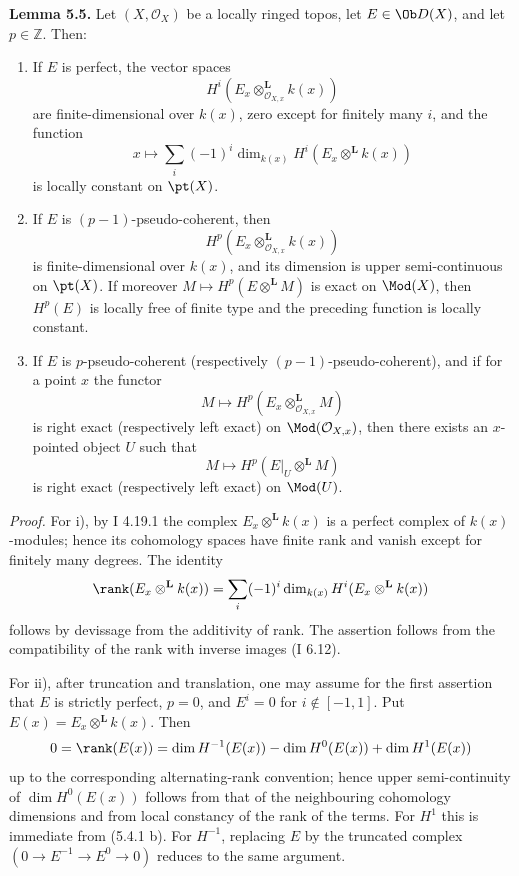 \textbf{Lemma 5.5.} Let \((X,\mathcal O_X)\) be a locally ringed topos, let \(E\in\Ob D(X)\), and let \(p\in\mathbb Z\). Then:
\begin{enumerate}[label=\roman*)]
\item If \(E\) is perfect, the vector spaces
\[
 H^i(E_x\otimes_{\mathcal O_{X,x}}^{\mathbf L}k(x))
\]
are finite-dimensional over \(k(x)\), zero except for finitely many \(i\), and the function
\[
 x\longmapsto
 \sum_i(-1)^i\dim_{k(x)}H^i(E_x\otimes^{\mathbf L}k(x))
\]
is locally constant on \(\pt(X)\).
\item If \(E\) is \((p-1)\)-pseudo-coherent, then
\[
 H^p(E_x\otimes_{\mathcal O_{X,x}}^{\mathbf L}k(x))
\]
is finite-dimensional over \(k(x)\), and its dimension is upper semi-continuous on \(\pt(X)\). If moreover \(M\mapsto H^p(E\otimes^{\mathbf L}M)\) is exact on \(\Mod(X)\), then \(H^p(E)\) is locally free of finite type and the preceding function is locally constant.
\item If \(E\) is \(p\)-pseudo-coherent (respectively \((p-1)\)-pseudo-coherent), and if for a point \(x\) the functor
\[
 M\longmapsto H^p(E_x\otimes_{\mathcal O_{X,x}}^{\mathbf L}M)
\]
is right exact (respectively left exact) on \(\Mod(\mathcal O_{X,x})\), then there exists an \(x\)-pointed object \(U\) such that
\[
 M\longmapsto H^p(E|_U\otimes^{\mathbf L}M)
\]
is right exact (respectively left exact) on \(\Mod(U)\).
\end{enumerate}

\emph{Proof.} For i), by I 4.19.1 the complex \(E_x\otimes^{\mathbf L}k(x)\) is a perfect complex of \(k(x)\)-modules; hence its cohomology spaces have finite rank and vanish except for finitely many degrees. The identity
\[
 \rank(E_x\otimes^{\mathbf L}k(x))
 =\sum_i(-1)^i\dim_{k(x)}H^i(E_x\otimes^{\mathbf L}k(x))
\]
follows by devissage from the additivity of rank. The assertion follows from the compatibility of the rank with inverse images (I 6.12).

For ii), after truncation and translation, one may assume for the first assertion that \(E\) is strictly perfect, \(p=0\), and \(E^i=0\) for \(i\notin[-1,1]\). Put \(E(x)=E_x\otimes^{\mathbf L}k(x)\). Then
\[
 0=\rank(E(x))
 =\dim H^{-1}(E(x))-\dim H^0(E(x))+\dim H^1(E(x))
\]
up to the corresponding alternating-rank convention; hence upper semi-continuity of \(\dim H^0(E(x))\) follows from that of the neighbouring cohomology dimensions and from local constancy of the rank of the terms. For \(H^1\) this is immediate from (5.4.1 b). For \(H^{-1}\), replacing \(E\) by the truncated complex \((0\to E^{-1}\to E^0\to0)\) reduces to the same argument.

